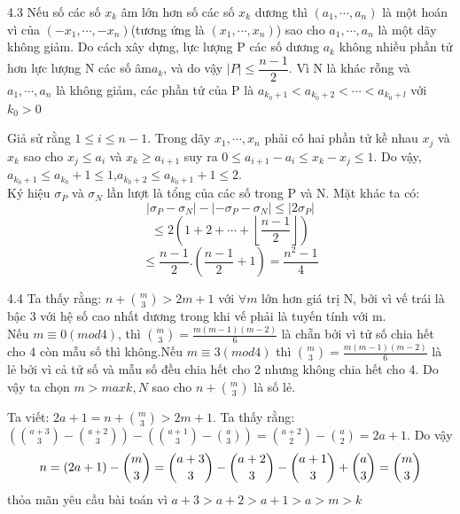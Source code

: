 \begin{Answer}{4.3}
Nếu số các số $x_k$ âm lớn hơn số các số $x_k$ dương thì  $(a_1,\cdots,a_n)$ là một hoán vì của $(-x_1,\cdots,-x_n)$(tương ứng là $(x_1,\cdots,x_n)$) sao cho $a_1,\cdots,a_n$ là một dãy không giảm.
Do cách xây dựng, lực lượng P các số dương $a_k$ không nhiều phần tử hơn lực lượng N các số âm$a_k$, và do vậy
$\left|P\right|\leq \dfrac{n-1}{2}$. Vì N là khác rỗng và $ a_1,\cdots,a_n$ là không giảm, các phần tử của P là $a_{k_0+1}<a_{k_0+2}<\cdots<a_{k_0+l}$ với $k_0> 0$

Giả sử rằng $1\leq i\leq n-1$. Trong dãy $x_1,\cdots,x_n$ phải có hai phần tử kề nhau $x_j$ và $x_k$ sao cho $x_j\leq a_i$ và $x_k \geq a_{i+1}$ suy ra $ 0\leq a_{i+1}-a_{i}\leq x_k-x_j\leq 1$. Do vậy, $a_{k_0+1}\leq a_{k_0}+1\leq 1$,$a_{k_0+2}\leq a_{k_0+1}+1 \leq 2$.\\
Ký hiệu $\sigma_{P}$ và $ \sigma_{N}$ lần lượt là tổng của các số trong P và N. Mặt khác ta có:
$$\left|\sigma_{P}-\sigma_{N}\right| -\left|-\sigma_{P}-\sigma_{N}\right|\leq \left|2\sigma_{P}\right|$$
$$\leq 2(1+2+\cdots+\left\lfloor\dfrac{n-1}{2}\right\rfloor)$$
$$\leq \dfrac{n-1}{2}.(\frac{n-1}{2}+1)=\dfrac{n^2-1}{4}$$
\end{Answer}
\begin{Answer}{4.4}
Ta thấy rằng: $n+\binom{m}{3}>2m+1$ với $\forall m$ lớn hơn giá trị N, bởi vì vế trái là bậc 3 với hệ số cao nhất dương trong khi vế phải là tuyến tính với m.\\

Nếu $m\equiv 0(mod4)$, thì $ \binom{m}{3}=\frac{m(m-1)(m-2)}{6}$ là chẵn bởi vì tử số chia hết cho 4 còn mẫu số thì không.Nếu $m\equiv 3(mod4)$ thì $ \binom{m}{3}=\frac{m(m-1)(m-2)}{6}$ là lẻ bởi vì cả tử số và mẫu số đều chia hết cho 2 nhưng không chia hết cho 4. Do vậy ta chọn $m>max{k,N}$ sao cho $n+\binom{m}{3}$ là số lẻ.

Ta viết: $2a+1=n+\binom{m}{3}>2m+1$. Ta thấy rằng:$(\binom{a+3}{3}-\binom{a+2}{3})-(\binom{a+1}{3}-\binom{a}{3})=\binom{a+2}{2}-\binom{a}{2}=2a+1$. Do vậy
$$n=(2a+1)-\dbinom{m}{3}=\dbinom{a+3}{3}-\dbinom{a+2}{3}-\dbinom{a+1}{3}+\dbinom{a}{3}=\dbinom{m}{3}$$
thỏa mãn yêu cầu bài toán vì $a+3>a+2>a+1>a>m>k$
\end{Answer}
